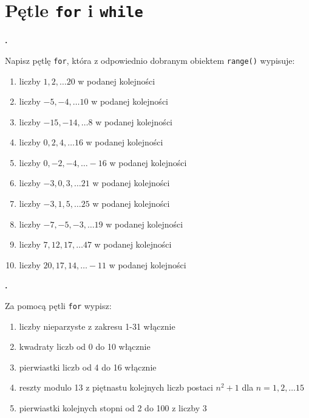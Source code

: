 \documentclass[a4paper]{article}
\begin{document}


\section{Pętle \texttt{for} i \texttt{while}}
\textbf{.}\addtocounter{zadanie}{1} Napisz pętlę \verb|for|, która z odpowiednio dobranym obiektem \verb|range()| wypisuje:

\begin{enumerate}[label=\arabic*.]
    \item liczby $1, 2, \dots 20$ w podanej kolejności
    \item liczby $-5, -4, \dots 10$ w podanej kolejności
    \item liczby $-15, -14, \dots 8$ w podanej kolejności
    \item liczby $0, 2, 4, \dots 16$ w podanej kolejności
    \item liczby $0, -2, -4, \dots -16$ w podanej kolejności
    \item liczby $-3, 0, 3, \dots 21$ w podanej kolejności
    \item liczby $-3, 1, 5, \dots 25$ w podanej kolejności
    \item liczby $-7, -5, -3, \dots 19$ w podanej kolejności
    \item liczby $7, 12, 17, \dots 47$ w podanej kolejności
    \item liczby $20, 17, 14, \dots -11$ w podanej kolejności
\end{enumerate}

\textbf{.}\addtocounter{zadanie}{1} Za pomocą pętli \verb|for| wypisz:
\begin{enumerate}[label=\arabic*.]
    \item liczby nieparzyste z zakresu 1-31 włącznie
    \item kwadraty liczb od 0 do 10 włącznie
    \item pierwiastki liczb od 4 do 16 włącznie
    \item reszty modulo 13 z piętnastu kolejnych liczb postaci $n^2 + 1$  dla $n=1, 2, \dots 15$
    \item pierwiastki kolejnych stopni od 2 do 100 z liczby 3
\end{enumerate}
\end{document}
